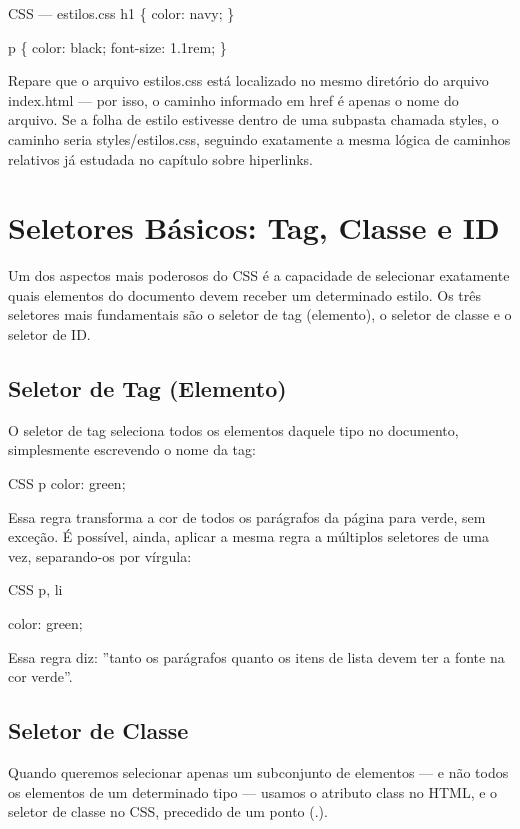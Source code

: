 CSS — estilos.css h1 \{ color: navy; \}

p \{ color: black; font-size: 1.1rem; \}

Repare que o arquivo estilos.css está localizado no mesmo diretório do arquivo index.html — por isso, o caminho informado em href é apenas o nome do arquivo. Se a folha de estilo estivesse dentro de uma subpasta chamada styles, o caminho seria styles/estilos.css, seguindo exatamente a mesma lógica de caminhos relativos já estudada no capítulo sobre hiperlinks.

\section{Seletores Básicos: Tag, Classe e ID}

Um dos aspectos mais poderosos do CSS é a capacidade de selecionar exatamente quais elementos do documento devem receber um determinado estilo. Os três seletores mais fundamentais são o seletor de tag (elemento), o seletor de classe e o seletor de ID.

\subsection{Seletor de Tag (Elemento)}

O seletor de tag seleciona todos os elementos daquele tipo no documento, simplesmente escrevendo o nome da tag:

\begin{codebox}{CSS}
p {
  color: green;
}
\end{codebox}

Essa regra transforma a cor de todos os parágrafos da página para verde, sem exceção. É possível, ainda, aplicar a mesma regra a múltiplos seletores de uma vez, separando-os por vírgula:

\begin{codebox}{CSS}
p, li {
  color: green;



}
\end{codebox}

Essa regra diz: ”tanto os parágrafos quanto os itens de lista devem ter a fonte na cor verde”.

\subsection{Seletor de Classe}

Quando queremos selecionar apenas um subconjunto de elementos — e não todos os elementos de um determinado tipo — usamos o atributo class no HTML, e o seletor de classe no CSS, precedido de um ponto (.).

